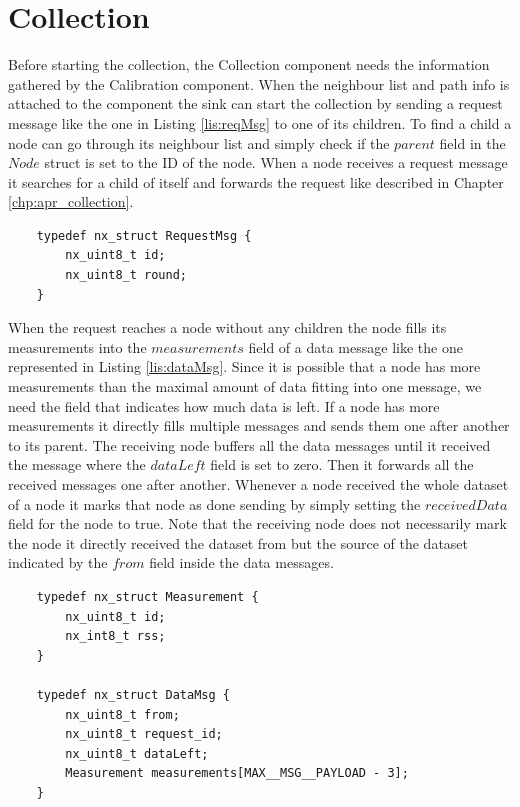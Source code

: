 \section{Collection}
\label{chp:imp_collection}
Before starting the collection, the Collection component needs the information gathered by the Calibration component. When the neighbour list and path info is attached to the component the sink can start the collection by sending a request message like the one in Listing \ref{lis:reqMsg} to one of its children. To find a child a node can go through its neighbour list and simply check if the $parent$ field in the $Node$ struct is set to the ID of the node. When a node receives a request message it searches for a child of itself and forwards the request like described in Chapter \ref{chp:apr_collection}.

\begin{lstlisting}
	typedef nx_struct RequestMsg {
		nx_uint8_t id;
		nx_uint8_t round;
	}
\end{lstlisting}

When the request reaches a node without any children the node fills its measurements into the $measurements$ field of a data message like the one represented in Listing \ref{lis:dataMsg}.
Since it is possible that a node has more measurements than the maximal amount of data fitting into one message, we need the field that indicates how much data is left. If a node has more measurements it directly fills multiple messages and sends them one after another to its parent. The receiving node buffers all the data messages until it received the message where the $dataLeft$ field is set to zero. Then it forwards all the received messages one after another. Whenever a node received the whole dataset of a node it marks that node as done sending by simply setting the $receivedData$ field for the node to true. Note that the receiving node does not necessarily mark the node it directly received the dataset from but the source of the dataset indicated by the $from$ field inside the data messages.

\begin{lstlisting}
	typedef nx_struct Measurement {
		nx_uint8_t id;
		nx_int8_t rss;
	}

	typedef nx_struct DataMsg {
		nx_uint8_t from;
		nx_uint8_t request_id;
		nx_uint8_t dataLeft;
		Measurement measurements[MAX__MSG__PAYLOAD - 3];
	}
\end{lstlisting}


